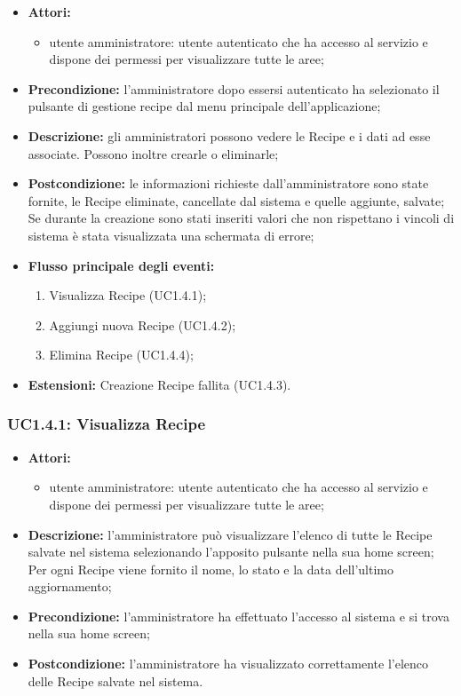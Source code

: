 \begin{itemize}
	\item \textbf{Attori:}
	\begin{itemize}
		\item utente amministratore: utente autenticato che ha accesso al servizio e dispone dei permessi per visualizzare tutte le aree;
	\end{itemize}
	\item \textbf{Precondizione:} l'amministratore dopo essersi autenticato ha selezionato il pulsante di gestione recipe dal menu principale dell'applicazione;
	\item \textbf{Descrizione:} gli amministratori possono vedere le Recipe e i dati ad esse associate. Possono inoltre crearle o eliminarle;
	\item \textbf{Postcondizione:} le informazioni richieste dall'amministratore sono state fornite, le Recipe eliminate, cancellate dal sistema e quelle aggiunte, salvate; Se durante la creazione sono stati inseriti valori che non rispettano i vincoli di sistema è stata visualizzata una schermata di errore;
	\item \textbf{Flusso principale degli eventi:}
	\begin{enumerate}
		\item Visualizza Recipe (UC1.4.1);
		\item Aggiungi nuova Recipe (UC1.4.2);
		\item Elimina Recipe (UC1.4.4);
	\end{enumerate}
	\item \textbf{Estensioni:} Creazione Recipe fallita (UC1.4.3).
\end{itemize}

\subsubsection{UC1.4.1: Visualizza Recipe}

\begin{itemize}
	\item \textbf{Attori:}
	\begin{itemize}
		\item utente amministratore: utente autenticato che ha accesso al servizio e dispone dei permessi per visualizzare tutte le aree;
	\end{itemize}
	\item \textbf{Descrizione:} l'amministratore può visualizzare l'elenco di tutte le Recipe salvate nel sistema selezionando l'apposito pulsante nella sua home screen; Per ogni Recipe viene fornito il nome, lo stato e la data dell'ultimo aggiornamento;
	\item \textbf{Precondizione:} l'amministratore ha effettuato l'accesso al sistema e si trova nella sua home screen;
	\item \textbf{Postcondizione:} l'amministratore ha visualizzato correttamente l'elenco delle Recipe salvate nel sistema.
\end{itemize}

